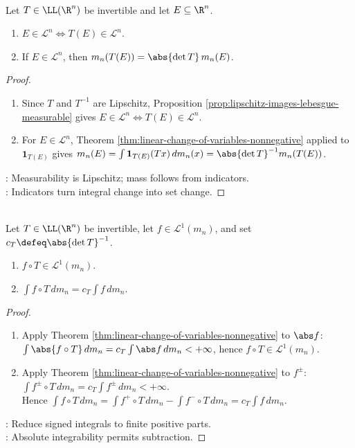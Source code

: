 \begin{corollary} \label{cor:invertible-linear-images-lebesgue-sets} \\
Let $T\in\LL(\R^n)$ be invertible and let $E\subseteq\R^n$.
\begin{enumerate}[label=(\roman*)]
\setlength{\itemsep}{0pt}
\item $E\in\mathcal L^n\Longleftrightarrow T(E)\in\mathcal L^n$.
\item If $E\in\mathcal L^n$, then $m_n(T(E))=\abs{\det T}\,m_n(E)$.
\end{enumerate}
\begin{proof}
\begin{enumerate}[label=(\roman*)]
\setlength{\itemsep}{0pt}
\item Since $T$ and $T^{-1}$ are Lipschitz, Proposition \ref{prop:lipschitz-images-lebesgue-measurable} gives $E\in\mathcal L^n\Longleftrightarrow T(E)\in\mathcal L^n$.
\item For $E\in\mathcal L^n$, Theorem \ref{thm:linear-change-of-variables-nonnegative} applied to $\mathbf{1}_{T(E)}$ gives $m_n(E)=\int\mathbf{1}_{T(E)}(Tx)\,dm_n(x)=\abs{\det T}^{-1}m_n(T(E))$.
\end{enumerate}
: Measurability is Lipschitz; mass follows from indicators.\\
: Indicators turn integral change into set change.
\end{proof}
\end{corollary}

\begin{corollary} \label{cor:linear-l1-change-of-variables} \\
Let $T\in\LL(\R^n)$ be invertible, let $f\in\mathscr L^1(m_n)$, and set $c_T\defeq\abs{\det T}^{-1}$.
\begin{enumerate}[label=(\roman*)]
\setlength{\itemsep}{0pt}
\item $f\circ T\in\mathscr L^1(m_n)$.
\item $\int f\circ T\,dm_n=c_T\int f\,dm_n$.
\end{enumerate}
\begin{proof}
\begin{enumerate}[label=(\roman*)]
\setlength{\itemsep}{0pt}
\item Apply Theorem \ref{thm:linear-change-of-variables-nonnegative} to $\abs f$: $\int\abs{f\circ T}\,dm_n=c_T\int\abs f\,dm_n<+\infty$, hence $f\circ T\in\mathscr L^1(m_n)$.
\item Apply Theorem \ref{thm:linear-change-of-variables-nonnegative} to $f^\pm$: $\int f^\pm\circ T\,dm_n=c_T\int f^\pm\,dm_n<+\infty$.\\
Hence $\int f\circ T\,dm_n=\int f^+\circ T\,dm_n-\int f^-\circ T\,dm_n=c_T\int f\,dm_n$.
\end{enumerate}
: Reduce signed integrals to finite positive parts.\\
: Absolute integrability permits subtraction.
\end{proof}
\end{corollary}

